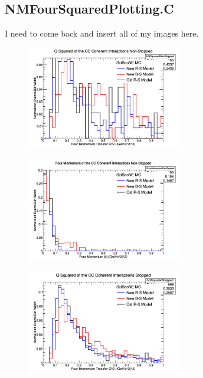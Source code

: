\documentclass[11pt]{article}
\begin{document}
\subsection{NMFourSquaredPlotting.C}
I need to come back and insert all of my images here.

\begin{figure}[H]
\centering
\includegraphics[width=0.6\textwidth]{NMFourSquaredPlottingImages/1-NMFourSquaredPlotting.png}
\caption{}
\end{figure}

\begin{figure}[H]
\centering
\includegraphics[width=0.6\textwidth]{NMFourSquaredPlottingImages/2-NMFourSquaredPlotting.png}
\caption{}
\end{figure}

\begin{figure}[H]
\centering
\includegraphics[width=0.6\textwidth]{NMFourSquaredPlottingImages/3-NMFourSquaredPlotting.png}
\caption{}
\end{figure}
\end{document}

